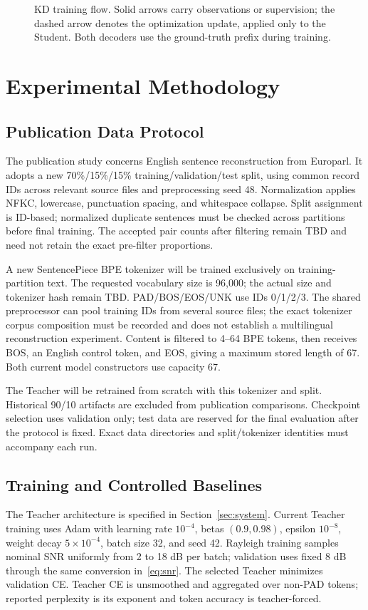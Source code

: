 \documentclass[conference]{IEEEtran}
\begin{document}
\begin{figure}[t]
 \centering
 
 \caption{KD training flow. Solid arrows carry observations or supervision; the dashed arrow denotes the optimization update, applied only to the Student. Both decoders use the ground-truth prefix during training.}
 \label{fig:kd}
\end{figure}

\section{Experimental Methodology}
\label{sec:experiments}
\subsection{Publication Data Protocol}
The publication study concerns English sentence reconstruction from Europarl. It adopts a new 70\%/15\%/15\% training/validation/test split, using common record IDs across relevant source files and preprocessing seed 48. Normalization applies NFKC, lowercase, punctuation spacing, and whitespace collapse. Split assignment is ID-based; normalized duplicate sentences must be checked across partitions before final training. The accepted pair counts after filtering remain TBD and need not retain the exact pre-filter proportions.

A new SentencePiece BPE tokenizer will be trained exclusively on training-partition text. The requested vocabulary size is 96,000; the actual size and tokenizer hash remain TBD. PAD/BOS/EOS/UNK use IDs 0/1/2/3. The shared preprocessor can pool training IDs from several source files; the exact tokenizer corpus composition must be recorded and does not establish a multilingual reconstruction experiment. Content is filtered to 4--64 BPE tokens, then receives BOS, an English control token, and EOS, giving a maximum stored length of 67. Both current model constructors use capacity 67.

The Teacher will be retrained from scratch with this tokenizer and split. Historical 90/10 artifacts are excluded from publication comparisons. Checkpoint selection uses validation only; test data are reserved for the final evaluation after the protocol is fixed. Exact data directories and split/tokenizer identities must accompany each run.

\subsection{Training and Controlled Baselines}
The Teacher architecture is specified in Section~\ref{sec:system}. Current Teacher training uses Adam with learning rate $10^{-4}$, betas $(0.9,0.98)$, epsilon $10^{-8}$, weight decay $5\times10^{-4}$, batch size 32, and seed 42. Rayleigh training samples nominal SNR uniformly from 2 to 18 dB per batch; validation uses fixed 8 dB through the same conversion in~\eqref{eq:snr}. The selected Teacher minimizes validation CE. Teacher CE is unsmoothed and aggregated over non-PAD tokens; reported perplexity is its exponent and token accuracy is teacher-forced.
\end{document}
